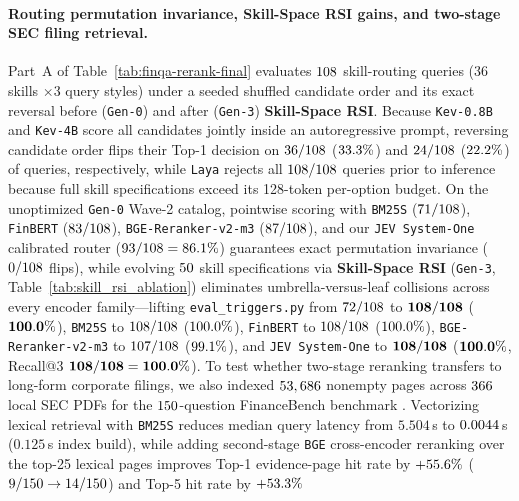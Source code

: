\paragraph{Routing permutation invariance, Skill-Space RSI gains, and two-stage SEC filing retrieval.}
Part~A of Table~\ref{tab:finqa-rerank-final} evaluates $108$ skill-routing queries ($36$ skills $\times 3$ query styles) under a seeded shuffled candidate order and its exact reversal before (\texttt{Gen-0}) and after (\texttt{Gen-3}) \textbf{Skill-Space RSI}. Because \texttt{Kev-0.8B} and \texttt{Kev-4B} score all candidates jointly inside an autoregressive prompt, reversing candidate order flips their Top-1 decision on $36/108$ ($33.3\%$) and $24/108$ ($22.2\%$) of queries, respectively, while \texttt{Laya} rejects all $108/108$ queries prior to inference because full skill specifications exceed its 128-token per-option budget. On the unoptimized \texttt{Gen-0} Wave-2 catalog, pointwise scoring with \texttt{BM25S} ($71/108$), \texttt{FinBERT} ($83/108$), \texttt{BGE-Reranker-v2-m3} ($87/108$), and our \texttt{JEV System-One} calibrated router ($93/108 = 86.1\%$) guarantees exact permutation invariance ($0/108$ flips), while evolving $50{}$ skill specifications via \textbf{Skill-Space RSI} (\texttt{Gen-3}, Table~\ref{tab:skill_rsi_ablation}) eliminates umbrella-versus-leaf collisions across every encoder family---lifting \texttt{eval\_triggers.py} from $72/108$ to $\mathbf{108/108}$ ($\mathbf{100.0\%}$), \texttt{BM25S} to $108/108$ ($100.0\%$), \texttt{FinBERT} to $108/108$ ($100.0\%$), \texttt{BGE-Reranker-v2-m3} to $107/108$ ($99.1\%$), and \texttt{JEV System-One} to $\mathbf{108/108}$ ($\mathbf{100.0\%}$, Recall@3 $\mathbf{108/108} = \mathbf{100.0\%}$). To test whether two-stage reranking transfers to long-form corporate filings, we also indexed $53,686$ nonempty pages across $366$ local SEC PDFs for the $150$-question FinanceBench benchmark \citep{islam2023financebench}. Vectorizing lexical retrieval with \texttt{BM25S} reduces median query latency from $5.504$\,s to $0.0044$\,s ($0.125$\,s index build), while adding second-stage \texttt{BGE} cross-encoder reranking over the top-25 lexical pages improves Top-1 evidence-page hit rate by $+55.6\%$ ($9/150 \rightarrow 14/150$) and Top-5 hit rate by $+53.3\%$ 